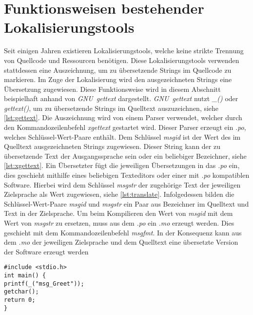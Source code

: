 \section{Funktionsweisen bestehender Lokalisierungstools}
Seit einigen Jahren existieren Lokalisierungstools, welche keine strikte Trennung von Quellcode und Ressourcen benötigen. Diese Lokalisierungstools verwenden stattdessen eine Auszeichnung, um zu übersetzende Strings im Quellcode zu markieren. Im Zuge der Lokalisierung wird den ausgezeichneten Strings eine Übersetzung zugewiesen. Diese Funktionsweise wird in diesem Abschnitt beispielhaft anhand von \mbox{\textit{GNU gettext}} dargestellt. \mbox{\textit{GNU gettext}} nutzt \mbox{\textit{\_()}} oder \mbox{\textit{gettext()}}, um zu übersetzende Strings im Quelltext auszuzeichnen, siehe \ref{lst:gettext}.
Die Auszeichnung wird von einem Parser verwendet, welcher durch den Kommandozeilenbefehl \mbox{\textit{xgettext}} gestartet wird. Dieser Parser erzeugt ein \mbox{\textit{\ac{.po}}}, welches Schlüssel-Wert-Paare enthält. Dem Schlüssel \mbox{\textit{msgid}} ist der Wert des im Quelltext ausgezeichneten Strings zugewiesen. Dieser String kann der zu übersetzende Text der Ausgangssprache sein oder ein beliebiger Bezeichner, siehe \ref{lst:xgettext}.
Ein Übersetzter fügt die jeweiligen Übersetzungen in das \mbox{\textit{\ac{.po}}} ein, dies geschieht mithilfe eines beliebigen Texteditors oder einer mit \mbox{\textit{\ac{.po}}} kompatiblen Software. Hierbei wird dem Schlüssel \mbox{\textit{msgstr}} der zugehörige Text der jeweiligen Zielsprache als Wert zugewiesen, siehe \ref{lst:translate}.
Infolgedessen bilden die Schlüssel-Wert-Paare \mbox{\textit{msgid}} und \mbox{\textit{msgstr}} ein Paar aus Bezeichner im  Quelltext und Text in der Zielsprache. Um beim Kompilieren den Wert von \mbox{\textit{msgid}} mit dem Wert von \mbox{\textit{msgstr}} zu ersetzen, muss aus dem \mbox{\textit{\ac{.po}}} ein \mbox{\textit{\ac{.mo}}} erzeugt werden. Dies geschieht mit dem Kommandozeilenbefehl \mbox{\textit{msgfmt}}. In der Konsequenz kann aus dem \mbox{\textit{\ac{.mo}}} der jeweiligen Zielsprache und dem Quelltext eine übersetzte Version der Software erzeugt werden
\autocite[Vgl.][]{Tykhomyrov.2002}
\autocite[Vgl.][]{Mauro.1999}
\autocite[Vgl.][]{GNU.}
\begin{lstlisting}[caption={Ausgezeichneter Quelltext}, label={lst:gettext}]
#include <stdio.h>
int main() {
printf(_("msg_Greet"));
getchar();
return 0;
}
\end{lstlisting}
